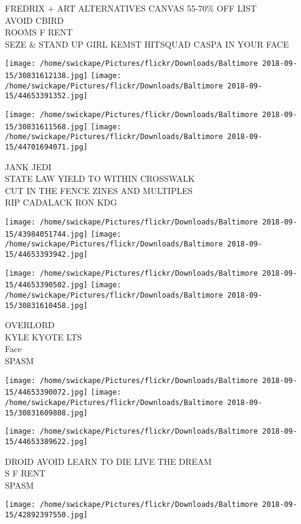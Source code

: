 \documentclass[10pt,letterpaper]{article}
\begin{document}
FREDRIX + ART ALTERNATIVES CANVAS 55{-}70\% OFF LIST\\
AVOID CBIRD\\
ROOMS F RENT\\
SEZE \& STAND UP GIRL KEMST HITSQUAD CASPA IN YOUR FACE
\pagebreak

\texttt{[image: /home/swickape/Pictures/flickr/Downloads/Baltimore 2018-09-15/30831612138.jpg]}
\texttt{[image: /home/swickape/Pictures/flickr/Downloads/Baltimore 2018-09-15/44653391352.jpg]}

\texttt{[image: /home/swickape/Pictures/flickr/Downloads/Baltimore 2018-09-15/30831611568.jpg]}
\texttt{[image: /home/swickape/Pictures/flickr/Downloads/Baltimore 2018-09-15/44701694071.jpg]}

JANK JEDI\\
STATE LAW YIELD TO WITHIN CROSSWALK\\
CUT IN THE FENCE ZINES AND MULTIPLES\\
RIP CADALACK RON KDG
\pagebreak

\texttt{[image: /home/swickape/Pictures/flickr/Downloads/Baltimore 2018-09-15/43984051744.jpg]}
\texttt{[image: /home/swickape/Pictures/flickr/Downloads/Baltimore 2018-09-15/44653393942.jpg]}

\texttt{[image: /home/swickape/Pictures/flickr/Downloads/Baltimore 2018-09-15/44653390502.jpg]}
\texttt{[image: /home/swickape/Pictures/flickr/Downloads/Baltimore 2018-09-15/30831610458.jpg]}

OVERLORD\\
KYLE KYOTE LTS\\
Face\\
SPASM
\pagebreak

\texttt{[image: /home/swickape/Pictures/flickr/Downloads/Baltimore 2018-09-15/44653390072.jpg]}
\texttt{[image: /home/swickape/Pictures/flickr/Downloads/Baltimore 2018-09-15/30831609808.jpg]}

\texttt{[image: /home/swickape/Pictures/flickr/Downloads/Baltimore 2018-09-15/44653389622.jpg]}

DROID AVOID LEARN TO DIE LIVE THE DREAM\\
S F RENT\\
SPASM
\pagebreak

\texttt{[image: /home/swickape/Pictures/flickr/Downloads/Baltimore 2018-09-15/42892397550.jpg]}
\end{document}
